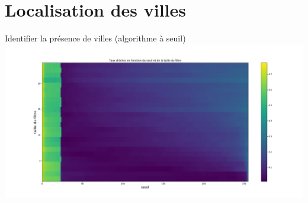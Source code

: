 \documentclass[ignorenonframetext,]{beamer}
\begin{document}
\section{Localisation des villes}
\frame{\sectionpage}
\begin{frame}{Identifier la présence de villes (algorithme à seuil)}
\includegraphics{filtre_vs_seuil.png}
\end{frame}
\end{document}

